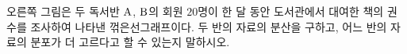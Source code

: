 \noindent\begin{minipage}[t]{0.58\linewidth}\vspace{0pt}\raggedright 오른쪽 그림은 두 독서반 $\mathrm{A}$, $\mathrm{B}$의 회원 $20$명이 한 달 동안 도서관에서 대여한 책의 권수를 조사하여 나타낸 꺾은선그래프이다. 두 반의 자료의 분산을 구하고, 어느 반의 자료의 분포가 더 고르다고 할 수 있는지 말하시오.\end{minipage}\hfill\begin{minipage}[t]{0.4\linewidth}\vspace{0pt}\centering \resizebox{\ifdim\width>\linewidth\linewidth\else\width\fi}{!}{}\end{minipage}\par
